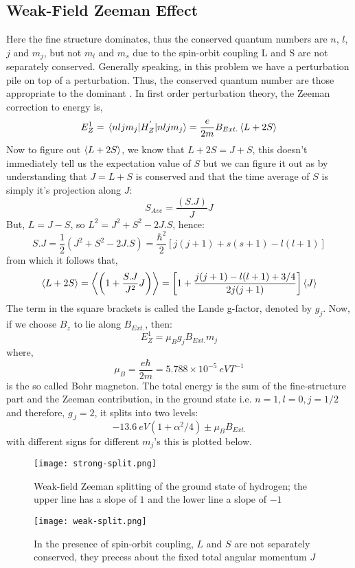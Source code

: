 \subsection{Weak-Field Zeeman Effect}
Here the fine structure dominates, thus the conserved quantum numbers are $n$, $l$, $j$ and $m_{j}$, but not $m_{l}$ and $m_{s}$ due to the spin-orbit coupling L and S are not separately conserved. Generally speaking, in this problem we have a perturbation pile on top of a perturbation. Thus, the conserved quantum number are those appropriate to the dominant . In first order perturbation theory, the Zeeman correction to energy is,
\begin{equation}
E^{1}_{Z} = \expval{H^{'}_{Z}}{nlj m_{j}} = \frac{e}{2m}B_{Ext.} \expval{L + 2S}
\end{equation} 
Now to figure out $\expval{L + 2S}$, we know that $L + 2S = J + S$, this doesn't immediately tell us the expectation value of $S$ but we can figure it out as by understanding that $J = L + S$ is conserved and that the time average of $S$ is simply it's projection along $J$:
\begin{equation}
S_{Ave} = \frac{(S.J)}{J}J
\end{equation}
But, $L = J - S$, so  $L^{2} = J^{2} + S^{2} - 2 J.S$, hence:
\begin{equation}
S.J = \frac{1}{2}(J^{2} + S^{2} - 2 J.S) = \frac{\hbar^{2}}{2}[j(j+1)+ s(s+1)-l(l+1)]
\end{equation}
from which it follows that,
\begin{equation}
\expval{L + 2S} = \expval{\left(1 + \frac{S.J}{J^{2}}J\right)} = \left[1 + \frac{j(j+1)-l(l+1) + 3/4}{2j(j+1)}\right]\expval{J}
\end{equation}
The term in the square brackets is called the Lande g-factor, denoted by $g_{j}$. Now, if we choose $B_{z}$ to lie along $B_{Ext.}$, then:
\begin{equation}
E^{1}_{Z} = \mu_{B} g_{j} B_{Ext.} m_{j}
\end{equation}
where,
$$\mu_{B} = \frac{e \hbar}{2m} = 5.788 \times 10^{-5} \ eVT^{-1}$$
is the so called Bohr magneton. The total energy is the sum of the fine-structure part and the Zeeman contribution, in the ground state i.e. $n = 1, l = 0, j = 1/2$ and therefore, $g_{J} = 2$, it splits into two levels:
\begin{equation}
-13.6 \ eV(1 + \alpha^{2}/4) \pm \mu_{B} B_{Ext.}
\end{equation}
with different signs for different $m_{j}$'s this is plotted below.
\begin{figure}[h]
	\centering
	\texttt{[image: strong-split.png]}
	\caption{Weak-field Zeeman splitting of the ground state of hydrogen; the upper line has a slope of $1$ and the lower line a slope of $-1$}
\end{figure}
\begin{figure}[h]
	\centering
	\texttt{[image: weak-split.png]}
	\caption{In the presence of spin-orbit coupling, $L$ and $S$ are not separately conserved, they precess about the fixed total angular momentum $J$}
\end{figure}
